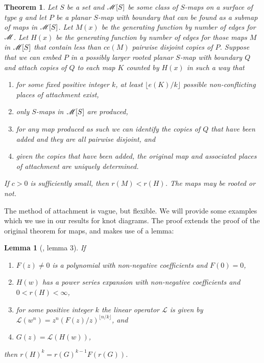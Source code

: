 \documentclass[amsmath,longbibliography,secnumarabic,floatfix,amssymb,nofootinbib,nobibnotes,letterpaper,11pt,notitlepage,tightenlines]{revtex4-1}
\newtheorem{theorem}{Theorem}
\newtheorem*{lemma*}{Lemma}
\begin{document}
\begin{theorem}Let $S$ be a set and $\mathscr{M}[S]$ be some class of
  $S$-maps on a surface of type $g$ and let $P$ be a planar $S$-map
  with boundary that can be found as a submap of maps in
  $\mathscr{M}[S]$. Let $M(x)$ be the generating function by number of
  edges for $\mathscr{M}$. Let $H(x)$ be the generating function by
  number of edges for those maps $M$ in $\mathscr{M}[S]$ that contain
  less than $ce(M)$ pairwise disjoint copies of $P$. Suppose that we
  can embed $P$ in a possibly larger rooted planar $S$-map with
  boundary $Q$ and attach copies of $Q$ to each map $K$
  counted by $H(x)$ in such a way that
  \begin{enumerate}
  \item for some fixed positive integer $k$, at least $\lfloor e(K)/k \rfloor$ possible
    non-conflicting places of attachment exist,
  \item only $S$-maps in $\mathscr{M}[S]$ are produced,
  \item for any map produced as such we can identify the copies of $Q$ that have been added and they
    are all pairwise disjoint, and
  \item given the copies that have been added, the original map and associated places of attachment
    are uniquely determined.
  \end{enumerate} If $c > 0$ is sufficiently small, then $r(M) < r(H)$. The maps may be rooted or
  not.
  \label{thr:weakpattern}
\end{theorem}

The method of attachment is vague, but flexible. We will provide some examples which we use in our
results for knot diagrams. The proof extends the proof of the original theorem for maps, and makes
use of a lemma:


\begin{lemma*}[\cite{Bender1992104}, lemma 3]
 If
 \begin{enumerate}
 \item $F(z) \ne 0$ is a polynomial with non-negative coefficients and $F(0) = 0$,
 \item $H(w)$ has a power series expansion with non-negative coefficients and $0 < r(H) < \infty$,
 \item for some positive integer $k$ the linear operator $\mathscr{L}$ is given by $\mathscr{L}(w^n)
   = z^n(F(z)/z)^{\lfloor n/k \rfloor}$, and
 \item $G(z) = \mathscr{L}(H(w))$,
 \end{enumerate}
 then $r(H)^k = r(G)^{k-1}F(r(G))$.
\end{lemma*}
\end{document}
